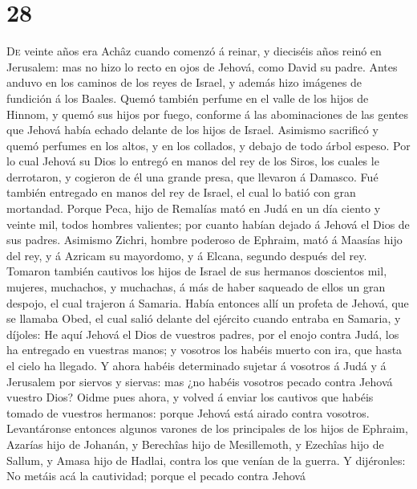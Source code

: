 \hypertarget{section-27}{%
\section{28}\label{section-27}}

 \textsc{De} veinte años era Achâz cuando comenzó á
reinar, y dieciséis años reinó en Jerusalem: mas no hizo lo recto en
ojos de Jehová, como David su padre.  Antes anduvo en los
caminos de los reyes de Israel, y además hizo imágenes de fundición á
los Baales.  Quemó también perfume en el valle de los
hijos de Hinnom, y quemó sus hijos por fuego, conforme á las
abominaciones de las gentes que Jehová había echado delante de los hijos
de Israel.  Asimismo sacrificó y quemó perfumes en los
altos, y en los collados, y debajo de todo árbol espeso. 
Por lo cual Jehová su Dios lo entregó en manos del rey de los Siros, los
cuales le derrotaron, y cogieron de él una grande presa, que llevaron á
Damasco. Fué también entregado en manos del rey de Israel, el cual lo
batió con gran mortandad.  Porque Peca, hijo de Remalías
mató en Judá en un día ciento y veinte mil, todos hombres valientes; por
cuanto habían dejado á Jehová el Dios de sus padres. 
Asimismo Zichri, hombre poderoso de Ephraim, mató á Maasías hijo del
rey, y á Azricam su mayordomo, y á Elcana, segundo después del rey.
 Tomaron también cautivos los hijos de Israel de sus
hermanos doscientos mil, mujeres, muchachos, y muchachas, á más de haber
saqueado de ellos un gran despojo, el cual trajeron á Samaria.
 Había entonces allí un profeta de Jehová, que se llamaba
Obed, el cual salió delante del ejército cuando entraba en Samaria, y
díjoles: He aquí Jehová el Dios de vuestros padres, por el enojo contra
Judá, los ha entregado en vuestras manos; y vosotros los habéis muerto
con ira, que hasta el cielo ha llegado.  Y ahora habéis
determinado sujetar á vosotros á Judá y á Jerusalem por siervos y
siervas: mas ¿no habéis vosotros pecado contra Jehová vuestro Dios?
 Oidme pues ahora, y volved á enviar los cautivos que
habéis tomado de vuestros hermanos: porque Jehová está airado contra
vosotros.  Levantáronse entonces algunos varones de los
principales de los hijos de Ephraim, Azarías hijo de Johanán, y
Berechîas hijo de Mesillemoth, y Ezechîas hijo de Sallum, y Amasa hijo
de Hadlai, contra los que venían de la guerra.  Y
dijéronles: No metáis acá la cautividad; porque el pecado contra Jehová
